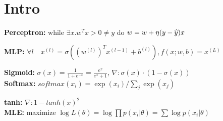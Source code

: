 \section{Intro}

\textbf{Perceptron:} while $\exists x. w^T x > 0 \neq y$ do $w = w + \eta (y - \widehat{y}) x$\\
\begin{comment}
	\Note{If the data is separable, the algorithm converges in finite time} \\
\end{comment}

\textbf{MLP:} $\forall l \quad x^{(l)} = \sigma((w^{(l)})^T x^{(l-1)} + b^{(l)}), f(x;w,b) = x^{(L)}$\\
\begin{comment}
	\textbf{Activation function:} If the activation function is linear, than the MLP is an affine transformation with a perciluar parameterization.\\
\end{comment}

\textbf{Sigmoid:} $\sigma(x) = \frac{1}{1 + e^{-x}} = \frac{e^x}{e^x + 1}$, $\nabla: \sigma(x) \cdot (1 - \sigma(x))$\\

\textbf{Softmax:} $softmax(x_i) = \exp(x_i) / \sum_j \exp(x_j)$\\
\begin{comment}
	\textbf{Requirements:} 
	Output must be positive \\
	output must be between $[0,1]$\\
	sum of all outputs must be 1, e.g. $\sum^M_i softmax(x_i) = 1$\\
\end{comment}

\textbf{tanh:} $\nabla: 1 - tanh(x)^2$\\

\textbf{MLE:} maximize $\log L(\theta) = \log \prod p(x_i| \theta) = \sum \log p(x_i | \theta)$\\
\begin{comment}
	\Note{Least squares and CE are ML estimators}\\
	\textbf{Algorithm:}\\
	Write down probability distribution\\
	Decompose into per sample probability\\
	Minimize negative log likelihood\\
\end{comment}

